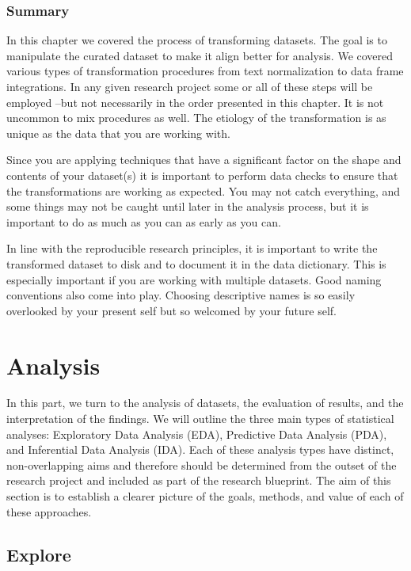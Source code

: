 \documentclass[
  letterpaper,
]{book}
\theoremstyle{definition}
\theoremstyle{remark}
\begin{document}
\section*{Summary}\label{summary-6}


In this chapter we covered the process of transforming datasets. The
goal is to manipulate the curated dataset to make it align better for
analysis. We covered various types of transformation procedures from
text normalization to data frame integrations. In any given research
project some or all of these steps will be employed --but not
necessarily in the order presented in this chapter. It is not uncommon
to mix procedures as well. The etiology of the transformation is as
unique as the data that you are working with.

Since you are applying techniques that have a significant factor on the
shape and contents of your dataset(s) it is important to perform data
checks to ensure that the transformations are working as expected. You
may not catch everything, and some things may not be caught until later
in the analysis process, but it is important to do as much as you can as
early as you can.

In line with the reproducible research principles, it is important to
write the transformed dataset to disk and to document it in the data
dictionary. This is especially important if you are working with
multiple datasets. Good naming conventions also come into play. Choosing
descriptive names is so easily overlooked by your present self but so
welcomed by your future self.

\part{Analysis}

In this part, we turn to the analysis of datasets, the evaluation of
results, and the interpretation of the findings. We will outline the
three main types of statistical analyses: Exploratory Data Analysis
(EDA), Predictive Data Analysis (PDA), and Inferential Data Analysis
(IDA). Each of these analysis types have distinct, non-overlapping aims
and therefore should be determined from the outset of the research
project and included as part of the research blueprint. The aim of this
section is to establish a clearer picture of the goals, methods, and
value of each of these approaches.

\chapter{Explore}\label{sec-explore-chapter}
\end{document}
